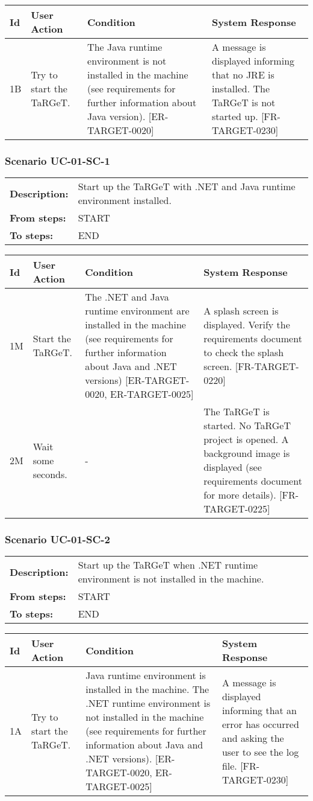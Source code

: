 \documentclass[a4paper,11pt]{article}
\newcommand{\bl}{\\ \hline}
\begin{document}
\begin{tabular}{|p{0.8in}|p{1.6in}|p{1.6in}|p{1.6in}|}
\hline
Id & User Action & Condition & System Response  \bl 
1B & Try to start the TaRGeT. & The Java runtime environment is not installed in the machine (see requirements for further information about Java version). [ER-TARGET-0020] & A message is displayed informing that no JRE is installed. The TaRGeT is not started up. [FR-TARGET-0230] \bl 
\end{tabular}
\subsubsection*{Scenario UC-01-SC-1}
\begin{tabular}{p{1in}p{4in}}
{\bf Description:} & Start up the TaRGeT with .NET and Java runtime environment installed. \\
{\bf From steps:} & START \\
{\bf To steps:} & END \\
\end{tabular}
 
\begin{tabular}{|p{0.8in}|p{1.6in}|p{1.6in}|p{1.6in}|}
\hline
Id & User Action & Condition & System Response  \bl 
1M & Start the TaRGeT. & The .NET and Java runtime environment are installed in the machine (see requirements for further information about Java and .NET versions) [ER-TARGET-0020, ER-TARGET-0025] & A splash screen is displayed. Verify the requirements document to check the splash screen. [FR-TARGET-0220] \bl 
2M & Wait some seconds. & - & The TaRGeT is started. No TaRGeT project is opened. A background image is displayed (see requirements document for more details). [FR-TARGET-0225] \bl 
\end{tabular}
\subsubsection*{Scenario UC-01-SC-2}
\begin{tabular}{p{1in}p{4in}}
{\bf Description:} & Start up the TaRGeT when .NET runtime environment is not installed in the machine. \\
{\bf From steps:} & START \\
{\bf To steps:} & END \\
\end{tabular}
 
\begin{tabular}{|p{0.8in}|p{1.6in}|p{1.6in}|p{1.6in}|}
\hline
Id & User Action & Condition & System Response  \bl 
1A & Try to start the TaRGeT. & Java runtime environment is installed in the machine. The .NET runtime environment is not installed in the machine (see requirements for further information about Java and .NET versions). [ER-TARGET-0020, ER-TARGET-0025] & A message is displayed informing that an error has occurred and asking the user to see the log file. [FR-TARGET-0230] \bl 
\end{tabular}
\end{document}
